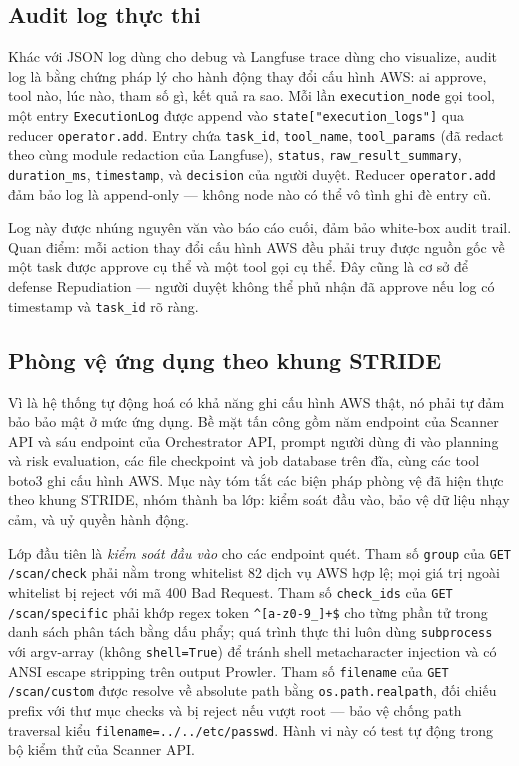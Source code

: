 \subsection{Audit log thực thi}
\label{sub:audit_log}

Khác với JSON log dùng cho debug và Langfuse trace dùng cho visualize, audit log là bằng chứng pháp lý cho hành động thay đổi cấu hình AWS: ai approve, tool nào, lúc nào, tham số gì, kết quả ra sao. Mỗi lần \texttt{execution\_node} gọi tool, một entry \texttt{ExecutionLog} được append vào \texttt{state["execution\_logs"]} qua reducer \texttt{operator.add}. Entry chứa \texttt{task\_id}, \texttt{tool\_name}, \texttt{tool\_params} (đã redact theo cùng module redaction của Langfuse), \texttt{status}, \texttt{raw\_result\_summary}, \texttt{duration\_ms}, \texttt{timestamp}, và \texttt{decision} của người duyệt. Reducer \texttt{operator.add} đảm bảo log là append-only — không node nào có thể vô tình ghi đè entry cũ.

Log này được nhúng nguyên văn vào báo cáo cuối, đảm bảo white-box audit trail. Quan điểm: mỗi action thay đổi cấu hình AWS đều phải truy được nguồn gốc về một task được approve cụ thể và một tool gọi cụ thể. Đây cũng là cơ sở để defense Repudiation — người duyệt không thể phủ nhận đã approve nếu log có timestamp và \texttt{task\_id} rõ ràng.

\subsection{Phòng vệ ứng dụng theo khung STRIDE}
\label{sub:app_defense}

Vì \sysname{} là hệ thống tự động hoá có khả năng ghi cấu hình AWS thật, nó phải tự đảm bảo bảo mật ở mức ứng dụng. Bề mặt tấn công gồm năm endpoint của Scanner API và sáu endpoint của Orchestrator API, prompt người dùng đi vào planning và risk evaluation, các file checkpoint và job database trên đĩa, cùng các tool boto3 ghi cấu hình AWS. Mục này tóm tắt các biện pháp phòng vệ đã hiện thực theo khung STRIDE, nhóm thành ba lớp: kiểm soát đầu vào, bảo vệ dữ liệu nhạy cảm, và uỷ quyền hành động.

Lớp đầu tiên là \emph{kiểm soát đầu vào} cho các endpoint quét. Tham số \texttt{group} của \texttt{GET /scan/check} phải nằm trong whitelist 82 dịch vụ AWS hợp lệ; mọi giá trị ngoài whitelist bị reject với mã 400 Bad Request. Tham số \texttt{check\_ids} của \texttt{GET /scan/specific} phải khớp regex token \texttt{\^{}[a-z0-9\_]+\$} cho từng phần tử trong danh sách phân tách bằng dấu phẩy; quá trình thực thi luôn dùng \texttt{subprocess} với argv-array (không \texttt{shell=True}) để tránh shell metacharacter injection và có ANSI escape stripping trên output Prowler. Tham số \texttt{filename} của \texttt{GET /scan/custom} được resolve về absolute path bằng \texttt{os.path.realpath}, đối chiếu prefix với thư mục checks và bị reject nếu vượt root — bảo vệ chống path traversal kiểu \texttt{filename=../../etc/passwd}. Hành vi này có test tự động trong bộ kiểm thử của Scanner API.

